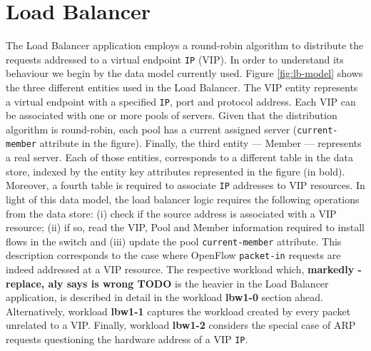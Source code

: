 
\label{cenas}


\section{Load Balancer}
\label{sec:feasibility:lb}
\glsresetall

The Load Balancer application employs a round-robin algorithm to distribute the
requests addressed to a virtual endpoint \texttt{IP} (VIP). In order to
understand its behaviour we begin by the data model currently used. Figure
\ref{fig:lb-model} shows the three different entities used in the Load
Balancer. The  VIP entity 
represents a virtual endpoint with a specified \texttt{IP}, port and
protocol address. Each VIP can be associated with one or more pools of
servers. Given that the distribution algorithm is round-robin, each pool
has a current assigned server (\texttt{current-member} attribute in the figure). Finally, the third entity --- Member
--- represents a real server. Each of those entities, corresponds
to a different table in the data store, indexed by the entity
key attributes represented in the figure (in bold). Moreover, a fourth table is
required to associate \texttt{IP} addresses to VIP resources. In light of
this data model, the load balancer logic requires the following
operations from the data store: (i) check if the source address is
associated with a VIP resource; (ii) if so, read the VIP, Pool and
Member information required to install flows in the switch and (iii)
update the pool \texttt{current-member} attribute. This description corresponds to the case where OpenFlow
\texttt{packet-in} requests are indeed addressed at a VIP
resource. The respective workload which, \textbf{markedly - replace,
  aly says is wrong TODO} is the heavier in
the Load Balancer application, is described in detail in the workload
\textbf{lbw1-0} section ahead. Alternatively, workload
\textbf{lbw1-1} captures the workload created by every
packet unrelated to a VIP. Finally, workload \textbf{lbw1-2}
considers the special case of ARP requests questioning the hardware
address of a VIP \texttt{IP}.

